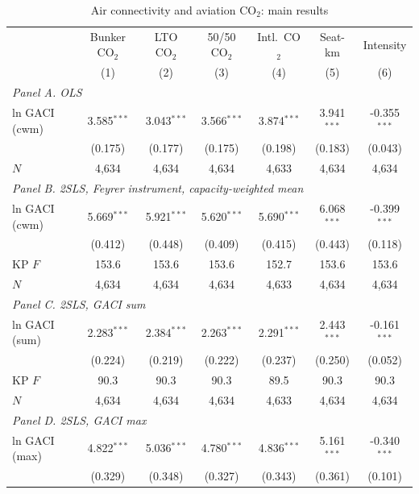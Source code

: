 \documentclass[11pt]{article}
\begin{document}
\begin{table}[htbp]
\centering
\begin{threeparttable}
\caption{Air connectivity and aviation CO$_2$: main results}
\label{tab:main}
\footnotesize
\begin{tabular}{lcccccc}
\toprule
 & \multicolumn{1}{c}{Bunker CO$_2$} & \multicolumn{1}{c}{LTO CO$_2$} & \multicolumn{1}{c}{50/50 CO$_2$} & \multicolumn{1}{c}{Intl.\ CO$_2$} & \multicolumn{1}{c}{Seat-km} & \multicolumn{1}{c}{Intensity} \\
 & (1) & (2) & (3) & (4) & (5) & (6) \\
\midrule
\multicolumn{7}{l}{\textit{Panel A. OLS}} \\
  ln GACI (cwm) & 3.585$^{***}$ & 3.043$^{***}$ & 3.566$^{***}$ & 3.874$^{***}$ & 3.941$^{***}$ & -0.355$^{***}$ \\
   & (0.175) & (0.177) & (0.175) & (0.198) & (0.183) & (0.043) \\
  $N$ & 4,634 & 4,634 & 4,634 & 4,633 & 4,634 & 4,634 \\
\midrule
\multicolumn{7}{l}{\textit{Panel B. 2SLS, Feyrer instrument, capacity-weighted mean}} \\
  ln GACI (cwm) & 5.669$^{***}$ & 5.921$^{***}$ & 5.620$^{***}$ & 5.690$^{***}$ & 6.068$^{***}$ & -0.399$^{***}$ \\
   & (0.412) & (0.448) & (0.409) & (0.415) & (0.443) & (0.118) \\
  KP $F$ & 153.6 & 153.6 & 153.6 & 152.7 & 153.6 & 153.6 \\
  $N$ & 4,634 & 4,634 & 4,634 & 4,633 & 4,634 & 4,634 \\
\midrule
\multicolumn{7}{l}{\textit{Panel C. 2SLS, GACI sum}} \\
  ln GACI (sum) & 2.283$^{***}$ & 2.384$^{***}$ & 2.263$^{***}$ & 2.291$^{***}$ & 2.443$^{***}$ & -0.161$^{***}$ \\
   & (0.224) & (0.219) & (0.222) & (0.237) & (0.250) & (0.052) \\
  KP $F$ & 90.3 & 90.3 & 90.3 & 89.5 & 90.3 & 90.3 \\
  $N$ & 4,634 & 4,634 & 4,634 & 4,633 & 4,634 & 4,634 \\
\midrule
\multicolumn{7}{l}{\textit{Panel D. 2SLS, GACI max}} \\
  ln GACI (max) & 4.822$^{***}$ & 5.036$^{***}$ & 4.780$^{***}$ & 4.836$^{***}$ & 5.161$^{***}$ & -0.340$^{***}$ \\
   & (0.329) & (0.348) & (0.327) & (0.343) & (0.361) & (0.101) \\

\end{tabular}
\end{threeparttable}
\end{table}
\end{document}
